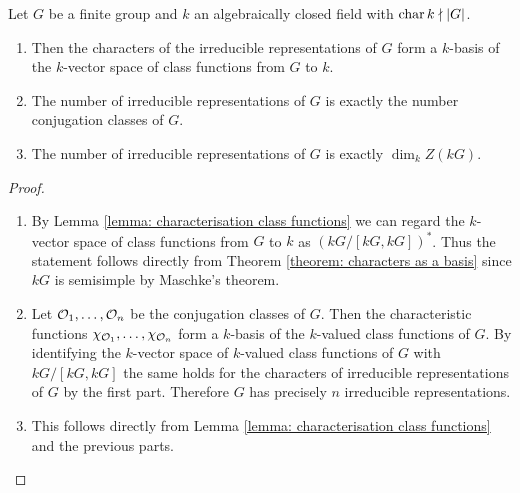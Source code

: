 \begin{proposition} \label{proposition: conjugation classes and irreducible representations}
  Let $G$ be a finite group and $k$ an algebraically closed field with $\operatorname{char} k \nmid |G|$.
  \begin{enumerate}[label=\emph{\alph*)}, leftmargin=*]
    \item
      Then the characters of the irreducible representations of $G$ form a $k$-basis of the $k$-vector space of class functions from $G$ to $k$.
    \item
      The number of irreducible representations of $G$ is exactly the number conjugation classes of $G$.
    \item
      The number of irreducible representations of $G$ is exactly $\dim_k Z(kG)$.
  \end{enumerate}
\end{proposition}
\begin{proof}
  \begin{enumerate}[label=\emph{\alph*)}, leftmargin=*]
    \item
      By Lemma \ref{lemma: characterisation class functions} we can regard the $k$-vector space of class functions from $G$ to $k$ as $(kG/[kG,kG])^*$.
      Thus the statement follows directly from Theorem \ref{theorem: characters as a basis} since $kG$ is semisimple by Maschke’s theorem.
    \item
      Let $\mathcal{O}_1, \dotsc, \mathcal{O}_n$ be the conjugation classes of $G$.
      Then the characteristic functions $\chi_{\mathcal{O}_1}, \dotsc, \chi_{\mathcal{O}_n}$ form a $k$-basis of the $k$-valued class functions of $G$.
      By identifying the $k$-vector space of $k$-valued class functions of $G$ with $kG/[kG,kG]$ the same holds for the characters of irreducible representations of $G$ by the first part.
      Therefore $G$ has precisely $n$ irreducible representations.
    \item
      This follows directly from Lemma \ref{lemma: characterisation class functions} and the previous parts.
  \end{enumerate}
\end{proof}


